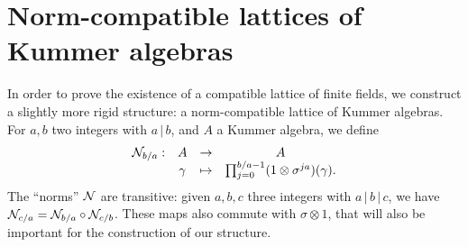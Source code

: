 \documentclass{sig-alternate}
\begin{document}
\section{Norm-compatible lattices of Kummer algebras}
\label{sec:lattices}

In order to prove the existence of a compatible lattice of finite fields,
we construct a slightly more rigid structure: a norm-compatible lattice of
Kummer algebras. For $a, b$ two integers with $a\,|\,b$, and $A$ a Kummer
algebra, we define
\[
\begin{array}{cccc}
  \mathcal{N}_{b/a}: & A & \to & A \\
  & \gamma & \mapsto & \prod_{j=0}^{b/a-1} (1 \otimes
  \sigma^{ja})(\gamma).
\end{array}
\]
The ``norms'' $\mathcal{N}$ are transitive: given $a, b, c$ three integers with
$a\,|\,b\,|\,c$, we have $\mathcal{N}_{c/a} = \mathcal{N}_{b/a}\circ\mathcal{N}_{c/b}$. These maps also
commute with $\sigma\otimes1$, that will also be important for the construction
of our structure.
\end{document}
